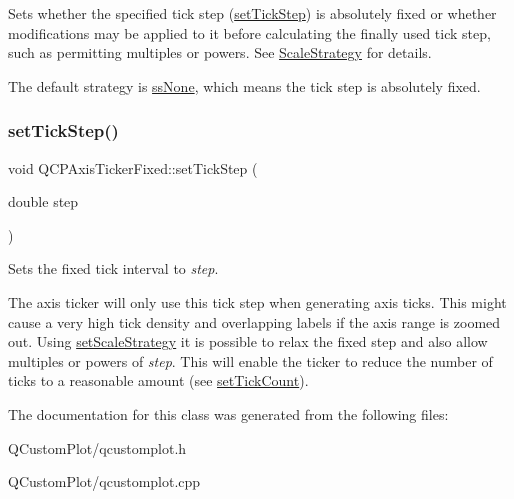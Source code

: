 Sets whether the specified tick step (\mbox{\hyperlink{class_q_c_p_axis_ticker_fixed_a4bc83d85a4f81d4abdd3fa5042d7b833}{set\+Tick\+Step}}) is absolutely fixed or whether modifications may be applied to it before calculating the finally used tick step, such as permitting multiples or powers. See \mbox{\hyperlink{class_q_c_p_axis_ticker_fixed_a15b3d38b935d404b1311eb85cfb6a439}{Scale\+Strategy}} for details.

The default strategy is \mbox{\hyperlink{class_q_c_p_axis_ticker_fixed_a15b3d38b935d404b1311eb85cfb6a439a6621275677a05caa0de204ae3956b85f}{ss\+None}}, which means the tick step is absolutely fixed. \mbox{\label{class_q_c_p_axis_ticker_fixed_a4bc83d85a4f81d4abdd3fa5042d7b833}} 
\subsubsection{\texorpdfstring{set\+Tick\+Step()}{setTickStep()}}
{\footnotesize\ttfamily void Q\+C\+P\+Axis\+Ticker\+Fixed\+::set\+Tick\+Step (\begin{DoxyParamCaption}\item[{double}]{step }\end{DoxyParamCaption})}

Sets the fixed tick interval to {\itshape step}.

The axis ticker will only use this tick step when generating axis ticks. This might cause a very high tick density and overlapping labels if the axis range is zoomed out. Using \mbox{\hyperlink{class_q_c_p_axis_ticker_fixed_acbc7c9bcd80b3dc3edee5f0519d301f6}{set\+Scale\+Strategy}} it is possible to relax the fixed step and also allow multiples or powers of {\itshape step}. This will enable the ticker to reduce the number of ticks to a reasonable amount (see \mbox{\hyperlink{class_q_c_p_axis_ticker_a47752abba8293e6dc18491501ae34008}{set\+Tick\+Count}}). 

The documentation for this class was generated from the following files\+:\begin{DoxyCompactItemize}
\item 
Q\+Custom\+Plot/qcustomplot.\+h\item 
Q\+Custom\+Plot/qcustomplot.\+cpp\end{DoxyCompactItemize}

